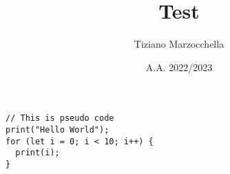 \documentclass[a4paper]{article}
\title{Test}
\author{Tiziano Marzocchella}
\date{A.A. 2022/2023}
\begin{document}
\maketitle

\begin{lstlisting}
// This is pseudo code
print("Hello World");
for (let i = 0; i < 10; i++) {
  print(i);
}
\end{lstlisting}
\end{document}
